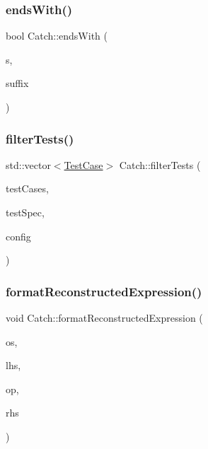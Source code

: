 \subsubsection{\texorpdfstring{ends\+With()}{endsWith()}\hspace{0.1cm}{\footnotesize\ttfamily [2/2]}}
{\footnotesize\ttfamily bool Catch\+::ends\+With (\begin{DoxyParamCaption}\item[{std\+::string const \&}]{s,  }\item[{char}]{suffix }\end{DoxyParamCaption})}

\mbox{\label{namespace_catch_ab5da9aa67c42a3f626aea07d0b556829}} 
\subsubsection{\texorpdfstring{filter\+Tests()}{filterTests()}}
{\footnotesize\ttfamily std\+::vector$<$\mbox{\hyperlink{class_catch_1_1_test_case}{Test\+Case}}$>$ Catch\+::filter\+Tests (\begin{DoxyParamCaption}\item[{std\+::vector$<$ \mbox{\hyperlink{class_catch_1_1_test_case}{Test\+Case}} $>$ const \&}]{test\+Cases,  }\item[{Test\+Spec const \&}]{test\+Spec,  }\item[{I\+Config const \&}]{config }\end{DoxyParamCaption})}

\mbox{\label{namespace_catch_a520110c31f26cf9892595772ab814fc0}} 
\subsubsection{\texorpdfstring{format\+Reconstructed\+Expression()}{formatReconstructedExpression()}}
{\footnotesize\ttfamily void Catch\+::format\+Reconstructed\+Expression (\begin{DoxyParamCaption}\item[{std\+::ostream \&}]{os,  }\item[{std\+::string const \&}]{lhs,  }\item[{\mbox{\hyperlink{class_catch_1_1_string_ref}{String\+Ref}}}]{op,  }\item[{std\+::string const \&}]{rhs }\end{DoxyParamCaption})}

